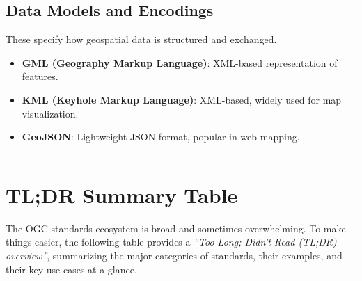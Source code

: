 \documentclass[
  11pt,
  letterpaper,
]{book}
\providecommand{\tightlist}{%
  \setlength{\itemsep}{0pt}\setlength{\parskip}{0pt}}
\begin{document}
\subsection{Data Models and Encodings}\label{data-models-and-encodings}

These specify how geospatial data is structured and exchanged.

\begin{itemize}
\tightlist
\item
  \textbf{GML (Geography Markup Language)}: XML-based representation of
  features.\\
\item
  \textbf{KML (Keyhole Markup Language)}: XML-based, widely used for map
  visualization.\\
\item
  \textbf{GeoJSON}: Lightweight JSON format, popular in web mapping.
\end{itemize}

\begin{center}\rule{0.5\linewidth}{0.5pt}\end{center}

\section{TL;DR Summary Table}\label{tldr-summary-table}

The OGC standards ecosystem is broad and sometimes overwhelming. To make
things easier, the following table provides a \emph{``Too Long; Didn't
Read (TL;DR) overview''}, summarizing the major categories of standards,
their examples, and their key use cases at a glance.
\end{document}
